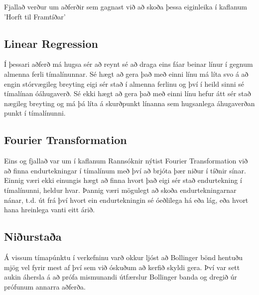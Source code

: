\documentclass{article}
\begin{document}
Fjallað verður um aðferðir sem gagnast við að skoða þessa eiginleika í kaflanum
'Horft til Framtíðar'

\subsection{Linear Regression}
Í þessari aðferð má hugsa sér að reynt sé að draga eins fáar beinar línur í
gegnum almenna ferli tímalínunnar. Sé hægt að gera það með einni línu má líta
svo á að engin stórvægileg breyting eigi sér stað í almenna ferlinu og því í
heild sinni sé tímalínan óáhugaverð. Sé ekki hægt að gera það með einni línu
hefur átt sér stað nægileg breyting og má þá líta á skurðpunkt línanna sem
hugsanlega áhugaverðan punkt í tímalínunni.

\subsection{Fourier Transformation}
Eins og fjallað var um í kaflanum Rannsóknir nýtist Fourier
Transformation við að finna endurtekningar í tímalínum með því að brjóta þær
niður í tíðnir sínar.  
Einnig væri ekki einungis hægt að finna hvort það eigi sér stað endurtekning í
tímalínunni, heldur hvar. Þannig væri mögulegt að skoða endurtekningarnar nánar,
t.d. út frá því hvort ein endurtekningin sé óeðlilega há eða lág, eða hvort hana
hreinlega vanti eitt árið.


\subsection{Niðurstaða}
Á vissum tímapúnktu í verkefninu varð okkur ljóst að Bollinger bönd hentuðu
mjög vel fyrir mest af því sem við óskuðum að kerfið skyldi gera.
Því var sett aukin áhersla á að prófa mismunandi útfærslur Bollinger banda og
dregið
úr prófunum annarra aðferða.

\hfil \\
\hfil \\
\hfil \\
\hfil \\
\end{document}
